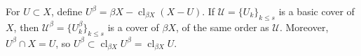 For $U \subset X$, define $U^\beta = \beta X - \operatorname{cl}_{\beta X}(X - U)$. If $\mathcal{U} = \{U_k\}_{k \leq s}$ is a basic cover of $X$, then $\mathcal{U}^\beta = \{U_k^\beta\}_{k \leq s}$ is a cover of $\beta X$, of the same order as $\mathcal{U}$. Moreover, $U^\beta \cap X = U$, so $U^\beta \subset \operatorname{cl}_{\beta X} U^\beta = \operatorname{cl}_{\beta X} U$.
